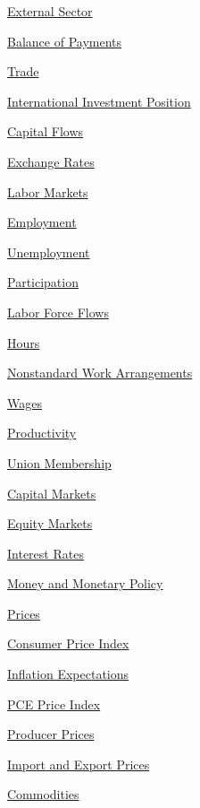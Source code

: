 \documentclass{report}
\begin{document}
\begin{minipage}{0.4\textwidth}
\begin{description}
\item {\hyperlink{ext}{External Sector}}
\begin{description}
\item {\hyperlink{exbop}{Balance of Payments}}
\item {\hyperlink{extt}{Trade}}
\item {\hyperlink{exiip}{International Investment Position}}
\item {\hyperlink{excf}{Capital Flows}}
\item {\hyperlink{extfx}{Exchange Rates}}
\end{description}
\item {\hyperlink{lab}{Labor Markets}}
\begin{description}
\item {\hyperlink{labe}{Employment}}
\item {\hyperlink{labu}{Unemployment}}
\item {\hyperlink{labp}{Participation}}
\item {\hyperlink{labf}{Labor Force Flows}}
\item {\hyperlink{labh}{Hours}}
\item {\hyperlink{labns}{Nonstandard Work Arrangements}}
\item {\hyperlink{labw}{Wages}}
\item {\hyperlink{labprod}{Productivity}}
\item {\hyperlink{labun}{Union Membership}}
\end{description}
\item {\hyperlink{cap}{Capital Markets}}
\begin{description}
\item {\hyperlink{capeq}{Equity Markets}}
\item {\hyperlink{capint}{Interest Rates}}
\item {\hyperlink{capmm}{Money and Monetary Policy}}
\end{description}
\item {\hyperlink{pr}{Prices}}
\begin{description}
\item {\hyperlink{prin}{Consumer Price Index}}
\item {\hyperlink{prie}{Inflation Expectations}}
\item {\hyperlink{prpce}{PCE Price Index}}
\item {\hyperlink{prp}{Producer Prices}}
\item {\hyperlink{prex}{Import and Export Prices}}
\item {\hyperlink{prco}{Commodities}}
\end{description}
\end{description}
\vspace{0.6cm}
\end{minipage}
\newpage
\end{document}
